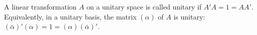A linear transformation $A$ on a unitary space is called unitary if $A'A = 1 = AA'$. Equivalently, in a unitary basis, the matrix $(\alpha)$ of $A$ is unitary: $(\bar{\alpha})'(\alpha) = 1 = (\alpha)(\bar{\alpha})'$.
